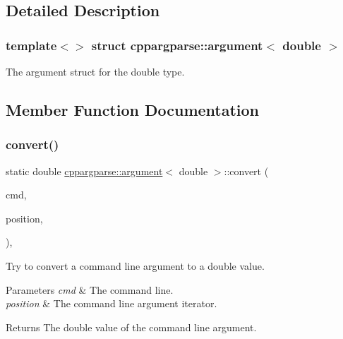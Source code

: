 \subsection{Detailed Description}
\subsubsection*{template$<$$>$\newline
struct cppargparse\+::argument$<$ double $>$}

The argument struct for the double type. 

\subsection{Member Function Documentation}
\mbox{\label{structcppargparse_1_1argument_3_01double_01_4_a364bb87c111c11c91c1beafc6237dae4}} 
\subsubsection{\texorpdfstring{convert()}{convert()}}
{\footnotesize\ttfamily static double \hyperlink{structcppargparse_1_1argument}{cppargparse\+::argument}$<$ double $>$\+::convert (\begin{DoxyParamCaption}\item[{const \hyperlink{types_8h_a80adf2418b7ce9fe616698efa7533ecf}{types\+::\+Command\+Line\+\_\+t} \&}]{cmd,  }\item[{const \hyperlink{types_8h_a43b4f43f8940de1bf09ced6f1b668053}{types\+::\+Command\+Line\+Position\+\_\+t} \&}]{position,  }\item[{const \hyperlink{types_8h_a003c660afe2ee9c6cc39aea966e8926d}{types\+::\+Command\+Line\+Arguments\+\_\+t} \&}]{ }\end{DoxyParamCaption})\hspace{0.3cm}{\ttfamily [inline]}, {\ttfamily [static]}}



Try to convert a command line argument to a double value. 


\begin{DoxyParams}{Parameters}
{\em cmd} & The command line. \\
\hline
{\em position} & The command line argument iterator.\\
\hline
\end{DoxyParams}
\begin{DoxyReturn}{Returns}
The double value of the command line argument. 
\end{DoxyReturn}
\mbox{\label{structcppargparse_1_1argument_3_01double_01_4_a5c9b85ad2daa03840f04b5f3d598ab99}} 
